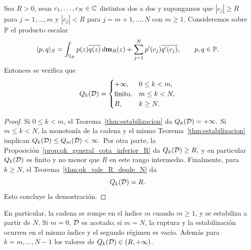 \begin{thm}\label{thm:descripcion_global_qk}
	Sea $R>0$, sean $c_1,\dots,c_N\in\mathbb{C}$ distintos dos a dos y supongamos que $|c_j|\ge R$ para $j=1,\dots,m$ y $|c_j|<R$ para $j=m+1,\dots,N$ con $m\ge1$. Consideremos sobre $\mathbb{P}$ el producto escalar
	\[
		\langle p,q\rangle_S
		=
		\int_{\mathbb{S}_R} p(z)\overline{q(z)}\,d\mathbf{m}_R(z)
		+
		\sum_{j=1}^N p'(c_j)\overline{q'(c_j)},
		\qquad p,q\in\mathbb{P}.
	\]
	Entonces se verifica que
	\[
		Q_k(\mathcal{D})=
		\begin{cases}
			+\infty,       & 0\le k<m, \\
			\text{finito}, & m\le k<N, \\
			R,             & k\ge N.
		\end{cases}
	\]
\end{thm}

\begin{proof}
	Si $0\le k<m$, el Teorema~\ref{thm:estabilizacion} da
	\(
	Q_k(\mathcal{D})=+\infty.
	\)
	Si $m\le k<N$, la monotonía de la cadena y el mismo Teorema~\ref{thm:estabilizacion} implican
	\(
	Q_k(\mathcal{D})\le Q_m(\mathcal{D})<\infty.
	\)
	Por otra parte, la Proposición~\ref{prop:qk_general_cota_inferior_R} da
	\(
	Q_k(\mathcal{D})\ge R,
	\)
	y en particular $Q_k(\mathcal{D})$ es finito y no menor que $R$ en este rango intermedio. Finalmente, para $k\ge N$, el Teorema~\ref{thm:qk_vale_R_desde_N} da
	\[
		Q_k(\mathcal{D})=R.
	\]
	Esto concluye la demostración.
\end{proof}

\begin{rmk}
	En particular, la cadena se rompe en el índice $m$ cuando $m\ge 1$, y se estabiliza a partir de $N$. Si $m=0$, $\mathcal{D}$ es acotado; si $m=N$, la ruptura y la estabilización ocurren en el mismo índice y el segundo régimen es vacío. Además para $k=m,\dots,N-1$ los valores de $Q_k(\mathcal{D}) \in (R, +\infty)$.
\end{rmk}